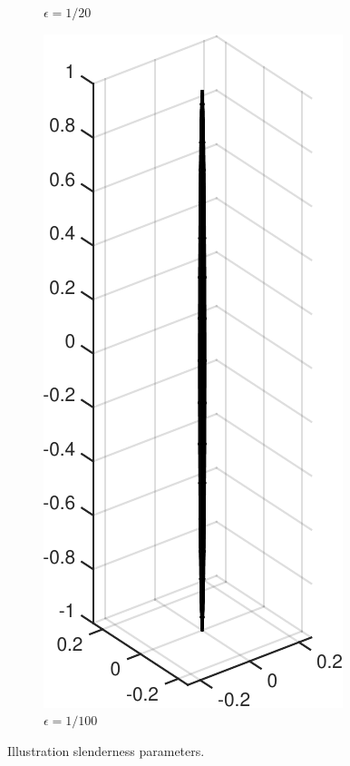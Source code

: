 \documentclass[a4paper,11pt]{kth-mag}
\begin{document}
\begin{figure}[!htbp]
\begin{subfigure}[h]{0.24\textwidth}
    \caption{$\epsilon=1/20$}\label{fig:slenderness_1_20}
  \end{subfigure}
  \begin{subfigure}[h]{0.24\textwidth}
    \centering
    \includegraphics[width=\textwidth]{img/slender/1_100.pdf}
    \caption{$\epsilon=1/100$}\label{fig:slenderness_1_100}
  \end{subfigure}
  \caption{Illustration slenderness parameters.}
  \label{fig:slenderness}
\end{figure}
\end{document}

